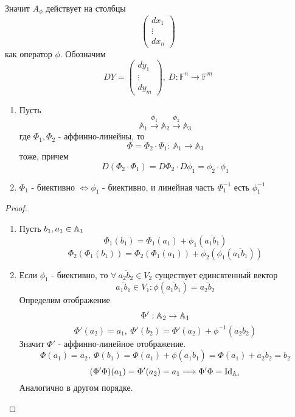 Значит $A_{\phi}$ действует на столбцы
\[\begin{pmatrix}
    dx_1\\
    \vdots\\
    dx_n
\end{pmatrix}
\]
как оператор $\phi$.
Обозначим
\[DY=\begin{pmatrix}
    dy_1\\
    \vdots\\
    dy_m
\end{pmatrix},\
D: \mathbb{F}^n \to \mathbb{F}^m
\]
\begin{subtheorem} \tab
    \begin{enumerate}
        \item Пусть 
        \[\mathbb{A}_1 \xrightarrow{\Phi_1} \mathbb{A}_2 \xrightarrow{\Phi_2} \mathbb{A}_3\]
        где $\Phi_1,\Phi_2$ - аффинно-линейны, то
        \[\Phi=\Phi_2\cdot \Phi_1: \ \mathbb{A}_1\to \mathbb{A}_3\]
        тоже, причем 
        \[D(\Phi_2\cdot \Phi_1)=D\Phi_2\cdot D\phi_1=\phi_2\cdot\phi_1\]
        \item $\Phi_1$ - биективно $\Longleftrightarrow \phi_1$ - биективно, и линейная часть $\Phi_1^{-1}$ есть $\phi_1^{-1}$
    \end{enumerate}
\end{subtheorem}
\begin{proof}
    \begin{enumerate}
        \item Пусть $b_1, a_1\in \mathbb{A}_1$
        \[\Phi_1(b_1)=\Phi_1(a_1)+\phi_1(\overline{a_1b_1})\]
        \[\Phi_2(\Phi_1(b_1))=\Phi_2(\Phi_1(a_1))+\phi_2(\phi_1(\overline{a_1b_1}))\]
        \item Если $\phi_1$ - биективно, то $\forall\ \overline{a_2b_2}\in V_2$ существует единсвтенный вектор
        \[\overline{a_1b_1}\in V_1: \phi(\overline{a_1b_1})=\overline{a_2b_2}\]
        Определим отображение 
        \[\Phi': \mathbb{A}_2\to \mathbb{A}_1\]
        \[\Phi'(a_2)=a_1,\ \Phi'(b_2)=\Phi'(a_2)+\phi^{-1}(\overline{a_2b_2})\]
        Значит $\Phi'$ - аффинно-линейное отображение.
        \[\Phi(a_1)=a_2,\ \Phi(b_1)=\Phi(a_1)+\phi(\overline{a_1b_1})=\Phi(a_1)+\overline{a_2b_2}=b_2\]
        \[(\Phi'\Phi)(a_1)=\Phi'(a_2)=a_1 \Longrightarrow \Phi'\Phi = \text{Id}_{\mathbb{A}_1}\] 
        Аналогично в другом порядке.
    \end{enumerate}
\end{proof} 
